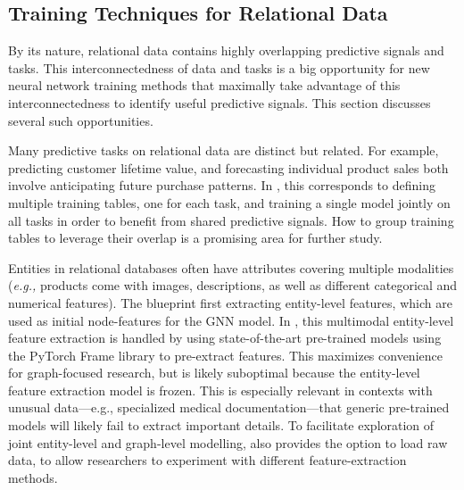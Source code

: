 \subsection{Training Techniques for Relational Data}

By its nature, relational data contains highly overlapping predictive signals and tasks. This interconnectedness of data and tasks is a big opportunity for new neural network training methods that maximally take advantage of this interconnectedness to identify useful predictive signals. This section discusses several such opportunities.


 Many predictive tasks on relational data are distinct but related. For example, predicting customer lifetime value, and forecasting individual product sales both involve anticipating future purchase patterns. In {\BenchmarkName}, this corresponds to defining multiple training tables, one for each task, and training a single model jointly on all tasks in order to benefit from shared predictive signals. How to group training tables to leverage their overlap is a promising area for further study. 



Entities in relational databases often have attributes covering multiple modalities (\emph{e.g.,} products come with images, descriptions, as well as different categorical and numerical features). The \AreaName blueprint first extracting entity-level features, which are used as initial node-features for the GNN model.
In \BenchmarkName, this multimodal entity-level feature extraction is handled by using state-of-the-art pre-trained models using the PyTorch Frame library to pre-extract features. This maximizes convenience for graph-focused research, but is likely suboptimal because the entity-level feature extraction model is frozen. This is especially relevant in contexts with unusual data---e.g., specialized medical documentation---that generic pre-trained models will likely fail to extract important details.
To facilitate exploration of joint entity-level and graph-level modelling, \BenchmarkName also provides the option to load raw data, to allow researchers to experiment with different feature-extraction methods.


